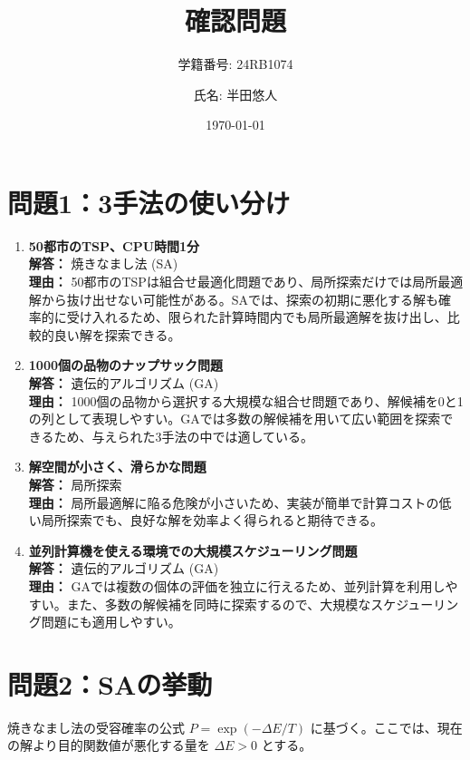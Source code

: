 \documentclass[a4paper,11pt]{jsarticle}
\title{確認問題}
\author{学籍番号: 24RB1074 \and 氏名: 半田悠人}
\date{\today}
\begin{document}
\maketitle

\section*{問題1：3手法の使い分け}

\begin{enumerate}
    \item \textbf{50都市のTSP、CPU時間1分} \\
    \textbf{解答：} 焼きなまし法 (SA) \\
    \textbf{理由：} 50都市のTSPは組合せ最適化問題であり、局所探索だけでは局所最適解から抜け出せない可能性がある。SAでは、探索の初期に悪化する解も確率的に受け入れるため、限られた計算時間内でも局所最適解を抜け出し、比較的良い解を探索できる。
    \item \textbf{1000個の品物のナップサック問題} \\
    \textbf{解答：} 遺伝的アルゴリズム (GA) \\
    \textbf{理由：} 1000個の品物から選択する大規模な組合せ問題であり、解候補を0と1の列として表現しやすい。GAでは多数の解候補を用いて広い範囲を探索できるため、与えられた3手法の中では適している。

    \item \textbf{解空間が小さく、滑らかな問題} \\
    \textbf{解答：} 局所探索 \\
    \textbf{理由：} 局所最適解に陥る危険が小さいため、実装が簡単で計算コストの低い局所探索でも、良好な解を効率よく得られると期待できる。

    \item \textbf{並列計算機を使える環境での大規模スケジューリング問題} \\
    \textbf{解答：} 遺伝的アルゴリズム (GA) \\
    \textbf{理由：} GAでは複数の個体の評価を独立に行えるため、並列計算を利用しやすい。また、多数の解候補を同時に探索するので、大規模なスケジューリング問題にも適用しやすい。
\end{enumerate}

\section*{問題2：SAの挙動}

焼きなまし法の受容確率の公式 $P = \exp(-\Delta E/T)$ に基づく。ここでは、現在の解より目的関数値が悪化する量を $\Delta E>0$ とする。
\end{document}
